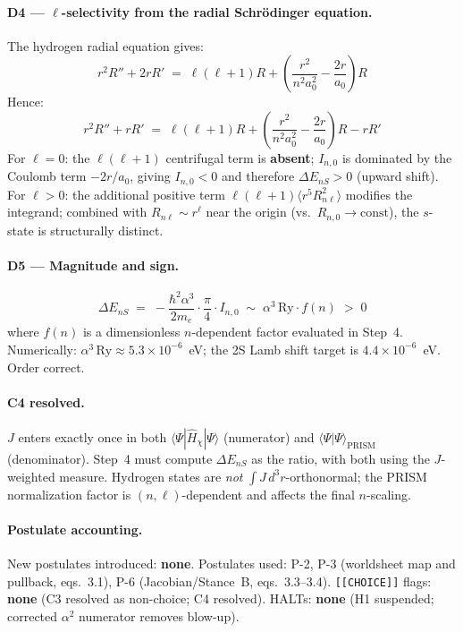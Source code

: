 \documentclass[11pt]{article}
\newcommand{\me}{m_e}
\begin{document}
\paragraph{D4 --- $\ell$-selectivity from the radial Schr\"{o}dinger equation.}
The hydrogen radial equation gives:
\begin{equation}
  r^2 R'' + 2rR'
  \;=\; \ell(\ell+1)R + \!\left(\frac{r^2}{n^2 a_0^2} - \frac{2r}{a_0}\right)\!R
  \tag{3.6}
\end{equation}
Hence:
\begin{equation}
  r^2 R'' + rR'
  \;=\; \ell(\ell+1)R
    + \!\left(\frac{r^2}{n^2 a_0^2} - \frac{2r}{a_0}\right)\!R - rR'
  \tag{3.7}
\end{equation}
For $\ell=0$: the $\ell(\ell+1)$ centrifugal term is \textbf{absent};
$I_{n,0}$ is dominated by the Coulomb term $-2r/a_0$, giving $I_{n,0}<0$
and therefore $\Delta E_{nS}>0$ (upward shift). \checkmark\\
For $\ell>0$: the additional positive term $\ell(\ell+1)\langle r^5 R_{n\ell}^2\rangle$
modifies the integrand; combined with $R_{n\ell}\!\sim\!r^\ell$ near the origin
(vs.\ $R_{n,0}\!\to\!\mathrm{const}$), the $s$-state is structurally distinct.

\paragraph{D5 --- Magnitude and sign.}
\begin{equation}
  \boxed{\Delta E_{nS}
  \;=\; -\frac{\hbar^2\alpha^3}{2\me}\cdot\frac{\pi}{4}\cdot I_{n,0}
  \;\sim\; \alpha^3\,\mathrm{Ry}\cdot f(n) \;>\;0}
  \tag{3.8}
\end{equation}
where $f(n)$ is a dimensionless $n$-dependent factor evaluated in Step~4.
Numerically: $\alpha^3\,\mathrm{Ry}\approx 5.3\!\times\!10^{-6}$~eV;
the 2S Lamb shift target is $4.4\!\times\!10^{-6}$~eV. Order correct. \checkmark

\paragraph{C4 resolved.}
$J$ enters exactly once in both $\langle\Psi|\hat{H}_\chi|\Psi\rangle$ (numerator)
and $\langle\Psi|\Psi\rangle_{\mathrm{PRISM}}$ (denominator).
Step~4 must compute $\Delta E_{nS}$ as the ratio, with both using the
$J$-weighted measure.
Hydrogen states are \emph{not} $\int J\,d^3r$-orthonormal;
the PRISM normalization factor is $(n,\ell)$-dependent and affects
the final $n$-scaling.

\paragraph{Postulate accounting.}
New postulates introduced: \textbf{none}.
Postulates used: P-2, P-3 (worldsheet map and pullback, eqs.\ 3.1),
P-6 (Jacobian/Stance~B, eqs.\ 3.3--3.4).
\texttt{[[CHOICE]]} flags: \textbf{none} (C3 resolved as non-choice; C4 resolved).
HALTs: \textbf{none} (H1 suspended; corrected $\alpha^2$ numerator removes blow-up).
\end{document}

